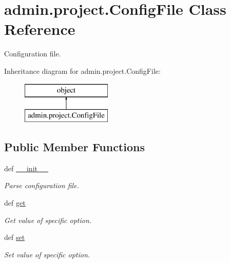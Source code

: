 \hypertarget{classadmin_1_1project_1_1ConfigFile}{\section{admin.\-project.\-Config\-File Class Reference}
\label{classadmin_1_1project_1_1ConfigFile}
}


Configuration file.  


Inheritance diagram for admin.\-project.\-Config\-File\-:\begin{figure}[H]
\begin{center}
\leavevmode
\includegraphics[height=2.000000cm]{dd/db5/classadmin_1_1project_1_1ConfigFile}
\end{center}
\end{figure}
\subsection*{Public Member Functions}
\begin{DoxyCompactItemize}
\item 
def \hyperlink{classadmin_1_1project_1_1ConfigFile_aa5145662890f4a0a0f7b73e15330037b}{\-\_\-\-\_\-init\-\_\-\-\_\-}
\begin{DoxyCompactList}\small\item\em Parse configuration file. \end{DoxyCompactList}\item 
def \hyperlink{classadmin_1_1project_1_1ConfigFile_ac5221b5bda9f0708aafc1a2f3486e100}{get}
\begin{DoxyCompactList}\small\item\em Get value of specific option. \end{DoxyCompactList}\item 
def \hyperlink{classadmin_1_1project_1_1ConfigFile_a36477348a6b887961c5af70996c009fa}{set}
\begin{DoxyCompactList}\small\item\em Set value of specific option. \end{DoxyCompactList}\end{DoxyCompactItemize}
